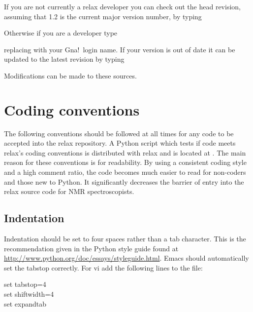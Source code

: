 If you are not currently a relax developer you can check out the head revision, assuming that 1.2 is the current major version number, by typing


Otherwise if you are a developer type


replacing  with your Gna!\ login name.  If your version is out of date it can be updated to the latest revision by typing


Modifications can be made to these sources.




\section{Coding conventions}

The following conventions should be followed at all times for any code to be accepted into the relax repository.  A Python script which tests if code meets relax's coding conventions is distributed with relax and is located at .  The main reason for these conventions is for readability.  By using a consistent coding style and a high comment ratio, the code becomes much easier to read for non-coders and those new to Python.  It significantly decreases the barrier of entry into the relax source code for NMR spectroscopists.



\subsection{Indentation}

Indentation should be set to four spaces rather than a tab character.  This is the recommendation given in the Python style guide found at \href{http://www.python.org/doc/essays/styleguide.html}{http://www.python.org/doc/essays/styleguide.html}.  Emacs should automatically set the tabstop correctly.  For vi add the following lines to the  file:

\begin{exampleenv}
set tabstop=4 \\
set shiftwidth=4 \\
set expandtab
\end{exampleenv}

